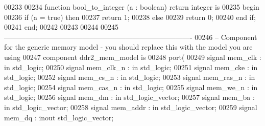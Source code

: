 \begin{DoxyCode}
00233 
00234     \textcolor{keywordflow}{function} bool_to_integer (a : \textcolor{comment}{boolean})  \textcolor{keywordflow}{return} \textcolor{comment}{integer} \textcolor{keywordflow}{is}
00235 \textcolor{vhdlkeyword}{    begin}
00236         \textcolor{keywordflow}{if} \textcolor{vhdlchar}{(}\textcolor{vhdlchar}{a} \textcolor{vhdlchar}{=} \textcolor{vhdlchar}{true}\textcolor{vhdlchar}{)} \textcolor{keywordflow}{then}
00237             \textcolor{keywordflow}{return} \textcolor{vhdllogic}{}\textcolor{vhdllogic}{1};
00238         \textcolor{keywordflow}{else}
00239             \textcolor{keywordflow}{return} \textcolor{vhdllogic}{}\textcolor{vhdllogic}{0};
00240         \textcolor{keywordflow}{end} \textcolor{keywordflow}{if};
00241     \textcolor{keywordflow}{end};
00242 
00243     
00244     
00245 \textcolor{keyword}{    -------------------------------------------------------------------------------}
00246 \textcolor{keyword}{    -- Component for the generic memory model - you should replace this with the model you are using}
00247     \textcolor{keywordflow}{component} ddr2_mem_model \textcolor{keywordflow}{is}
00248     \textcolor{keywordflow}{port}(
00249         \textcolor{keywordflow}{signal} mem_clk             : \textcolor{keywordflow}{in}     \textcolor{comment}{std\_logic};
00250         \textcolor{keywordflow}{signal} mem_clk_n           : \textcolor{keywordflow}{in}     \textcolor{comment}{std\_logic};
00251         \textcolor{keywordflow}{signal} mem_cke             : \textcolor{keywordflow}{in}     \textcolor{comment}{std\_logic};
00252         \textcolor{keywordflow}{signal} mem_cs_n            : \textcolor{keywordflow}{in}     \textcolor{comment}{std\_logic};
00253         \textcolor{keywordflow}{signal} mem_ras_n           : \textcolor{keywordflow}{in}     \textcolor{comment}{std\_logic};
00254         \textcolor{keywordflow}{signal} mem_cas_n           : \textcolor{keywordflow}{in}     \textcolor{comment}{std\_logic};
00255         \textcolor{keywordflow}{signal} mem_we_n            : \textcolor{keywordflow}{in}     \textcolor{comment}{std\_logic};
00256         \textcolor{keywordflow}{signal} mem_dm              : \textcolor{keywordflow}{in}     \textcolor{comment}{std\_logic\_vector};
00257         \textcolor{keywordflow}{signal} mem_ba              : \textcolor{keywordflow}{in}     \textcolor{comment}{std\_logic\_vector};
00258         \textcolor{keywordflow}{signal} mem_addr            : \textcolor{keywordflow}{in}     \textcolor{comment}{std\_logic\_vector};
00259         \textcolor{keywordflow}{signal} mem_dq              : \textcolor{keywordflow}{inout}  \textcolor{comment}{std\_logic\_vector};

\end{DoxyCode}
